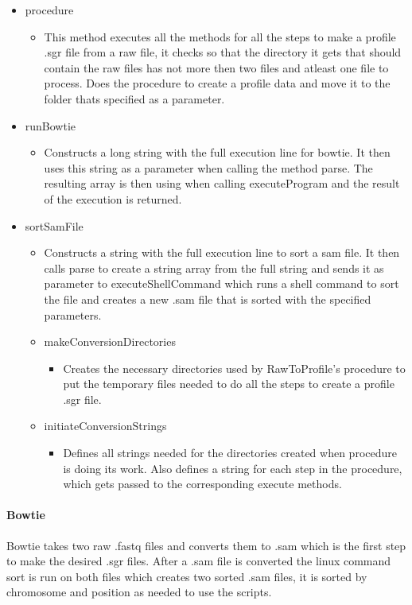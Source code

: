 \begin{itemize} 
\item procedure
\begin{itemize}
\item This method executes all the methods for all the steps to make a profile .sgr file from a raw file, it checks so that the directory it gets that should contain the raw files has not more then two files and atleast one file to process. Does the procedure to create a profile data and move it to the folder thats specified as a parameter.
\end{itemize}

\item runBowtie
\begin{itemize}
\item Constructs a long string with the full execution line for bowtie. It then uses this string as a parameter when calling the method parse. 
The resulting array is then using when calling executeProgram and the result of the execution is returned.
\end{itemize}
\item sortSamFile
\begin{itemize}
\item Constructs a string with the full execution line to sort a sam file. It then calls parse to create a string array from the full string and sends it as parameter to executeShellCommand which runs a shell command to sort the file and creates a new .sam file that is sorted with the specified parameters.
\item makeConversionDirectories
\begin{itemize}
\item Creates the necessary directories used by RawToProfile's procedure to put the temporary files needed to do all the steps to create a profile .sgr file.
\end{itemize}
\item initiateConversionStrings
\begin{itemize}
\item Defines all strings needed for the directories created when procedure is doing its work. Also defines a string for each step in the procedure, which gets passed to the corresponding execute methods. 
\end{itemize}
\end{itemize}
\end{itemize}

\paragraph{Bowtie}
Bowtie takes two raw .fastq files and converts them to .sam which is the first step to make the desired .sgr files. After a .sam file is converted the linux command sort is run  on both files which creates two sorted .sam files, it is sorted by chromosome and position as needed to use the scripts.

